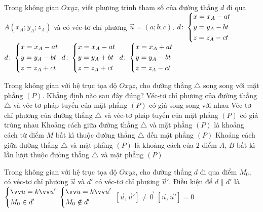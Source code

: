 \begin{ex}%
	Trong không gian $Oxyz$, viết phương trình tham số của đường thẳng $d$ đi qua $A(x_A;y_A;z_A)$ và có véc-tơ chỉ phương $\vec{u} = (a;b;c)$.
	\choice
	{\True $d \colon \left\{\begin{aligned}&x = x_A - at\\&y = y_A - bt\\&z = z_A-ct\end{aligned}\right.$}
	{$d \colon \left\{\begin{aligned}&x = x_A - at\\&y = y_A-bt\\&z = z_A + ct\end{aligned}\right.$}
	{$ d \colon \left\{\begin{aligned}&x = x_A - at\\&y = y_A+bt\\&z = z_A + ct\end{aligned}\right.$}
	{$d \colon \left\{\begin{aligned}&x = x_A + at\\&y = y_A-bt\\&z = z_A - ct\end{aligned}\right.$}
\end{ex}




\begin{ex}%
	Trong không gian với hệ trục tọa độ $Oxyz$, cho đường thẳng $\triangle$ song song với mặt phẳng $(P)$. Khẳng định nào sau đây đúng?
	\choice
	{Véc-tơ chỉ phương của đường thẳng $\triangle$ và véc-tơ pháp tuyến của mặt phẳng $(P)$ có giá song song với nhau}
	{Véc-tơ chỉ phương của đường thẳng $\triangle$ và véc-tơ pháp tuyến của mặt phẳng $(P)$ có giá trùng nhau}
	{\True Khoảng cách giữa đường thẳng $\triangle$ và mặt phẳng $(P)$ là khoảng cách từ điểm $M$ bất kì thuộc đường thẳng $\triangle$ đến mặt phẳng $(P)$}
	{Khoảng cách giữa đường thẳng $\triangle$ và mặt phẳng $(P)$ là khoảng cách của $2$ điểm $A$, $B$ bất kì lần lượt thuộc đường thẳng $\triangle$ và mặt phẳng $(P)$}
\end{ex}

\begin{ex}%
	Trong không gian với hệ trục tọa độ $Oxyz$, cho đường thẳng $d$ đi qua điểm $M_0$, có véc-tơ chỉ phương $\vec{u}$ và $d'$ có véc-tơ chỉ phương $\vec{u}'$. Điều kiện để $d \parallel d'$ là
	\choice
	{$\heva{&\vec{u}=k\vec{u}' \\ &M_0 \in  d'}$}
	{\True $\heva{&\vec{u}=k\vec{u}' \\ &M_0 \notin  d'}$}
	{$\left[\vec{u},\vec{u}'\right]\ne \vec{0}$}
	{$\left[\vec{u},\vec{u}'\right]= 0$}
\end{ex}

